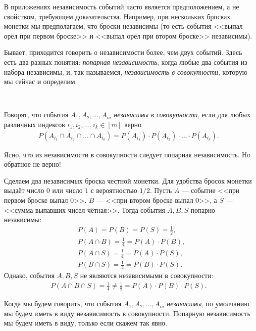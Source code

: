 \documentclass[../main.tex]{subfiles}
\begin{document}
В приложениях независимость событий часто является предположением, а не свойством, требующем доказательства. Например, при нескольких бросках монетки мы предполагаем, что броски независимы (то есть события <<выпал орёл при первом броске>> и <<выпал орёл при втором броске>> независимы).

Бывает, приходится говорить о независимости более, чем двух событий. Здесь есть два разных понятия: \textit{попарная независимость}, когда любые два события из набора независимы, и, так называемся, \textit{независимость в совокупности}, которую мы сейчас и определим.

\begin{df}\

 Говорят, что события $A_1, A_2, \ldots, A_m$ \textit{независимы в совокупности}, если для любых различных индексов $i_1, i_2, \ldots, i_k \in [m]$ верно
 \begin{align*}
  P(A_{i_1} \cap A_{i_2} \cap \ldots \cap A_{i_k}) = P(A_{i_1}) \cdot P(A_{i_2}) \cdot \ldots \cdot P(A_{i_k}).
 \end{align*} 
\end{df}

Ясно, что из независимости в совокупности следует попарная независимость. Но обратное не верно!

\begin{exmpl}
 Сделаем два независимых броска честной монетки. Для удобства бросок монетки выдаёт число $ 0 $ или число $ 1 $ с вероятностью $ 1 / 2 $. Пусть $ A $ --- событие <<при первом броске выпал $ 0 $>>, $ B $ --- <<при втором броске выпал $ 0 $>>, а $ S $ --- <<сумма выпавших чисел чётная>>. Тогда события $ A, B, S $ попарно независимы:
 \begin{align*}
  &P(A) = P(B) = P(S) = \frac{1}{2}, \\
  &P(A \cap B) = \frac{1}{4} = P(A) \cdot P(B), \\
  &P(A \cap S) = \frac{1}{4} = P(A) \cdot P(S), \\
  &P(B \cap S) = \frac{1}{4} = P(B) \cdot P(S).
 \end{align*} Однако, события $ A,B,S $ не являются независимыми в совокупности:
 \begin{align*}
  P(A \cap B \cap S) = \frac{1}{4} \neq \frac{1}{8} = P(A) \cdot P(B) \cdot P(S).
 \end{align*}
\end{exmpl}

\begin{conventn*}
 Когда мы будем говорить, что события $ A_1, A_2, \ldots, A_m $ \textit{независимы}, по умолчанию мы будем иметь в виду независимость в совокупности. Попарную независимость мы будем иметь в виду, только если скажем так явно.
\end{conventn*}
\end{document}
